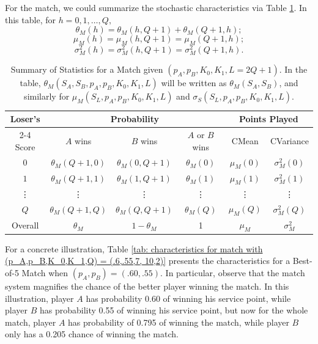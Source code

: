 \documentclass[11pt]{article}
\theoremstyle{plain}
\theoremstyle{definition}
\begin{document}
For the match, we could summarize the stochastic characteristics via Table \ref{tab: match statistics}. In this table, for $h = 0, 1, \ldots, Q,$
%
$$\theta_M(h) =  \theta_M(h,Q+1) + \theta_M(Q+1,h);$$
$$\mu_M(h) = \mu_M(h,Q+1) = \mu_M(Q+1,h);$$  $$\sigma_M^2(h) = \sigma_M^2(h,Q+1) = \sigma_M^2(Q+1,h).$$
%

\begin{table}[h]
\begin{center}
\begin{tabular}{||c||c|c|c||c|c||} \hline
Loser's & \multicolumn{3}{c||}{Probability} & \multicolumn{2}{c||}{Points Played} \\ \cline{2-4} \cline{5-6}
Score & $A$ wins & $B$ wins & $A$ or $B$ wins & CMean & CVariance \\ \hline
$0$ & $\theta_M(Q+1,0)$ & $\theta_M(0,Q+1)$ & $\theta_M(0)$ & $\mu_M(0)$ & $\sigma_M^2(0)$ \\ 
$1$ & $\theta_M(Q+1,1)$ & $\theta_M(1,Q+1)$ &$\theta_M(1)$ & $\mu_M(1)$ & $\sigma_M^2(1)$ \\ 
\vdots & \vdots & \vdots & \vdots & \vdots & \vdots \\
$Q$ & $\theta_M(Q+1,Q)$ & $\theta_M(Q,Q+1)$ & $\theta_M(Q)$ & $\mu_M(Q)$ & $\sigma_M^2(Q)$ \\ \hline
Overall & $\theta_M$ & $1-\theta_M$ & 1 & $\mu_M$ & $\sigma_M^2$ \\ \hline\hline
\end{tabular}
\caption{Summary of Statistics for a Match given $(p_A,p_B,K_0,K_1,L=2Q+1)$. In the table, $\theta_M(S_A,S_B,p_A,p_B,K_0,K_1,L)$ will be written as $\theta_M(S_A,S_B)$, and similarly for $\mu_M(S_L,p_A,p_B,K_0,K_1,L)$ and $\sigma_S(S_L,p_A,p_B,K_0,K_1,L)$.}
\label{tab: match statistics}
\end{center}
\end{table}

For a concrete illustration, Table \ref{tab: characteristics for match with (p_A,p_B,K_0,K_1,Q) = (.6,.55,7, 10,2)} presents the characteristics for a Best-of-5 Match when $(p_A,p_B) = (.60,.55)$. In particular, observe that the match system magnifies the chance of the better player winning the match. In this illustration, player $A$ has probability 0.60 of winning his service point, while player $B$ has probability 0.55 of winning his service point, but now for the whole match, player $A$ has probability of 0.795 of winning the match, while player $B$ only has a 0.205 chance of winning the match.
\end{document}
